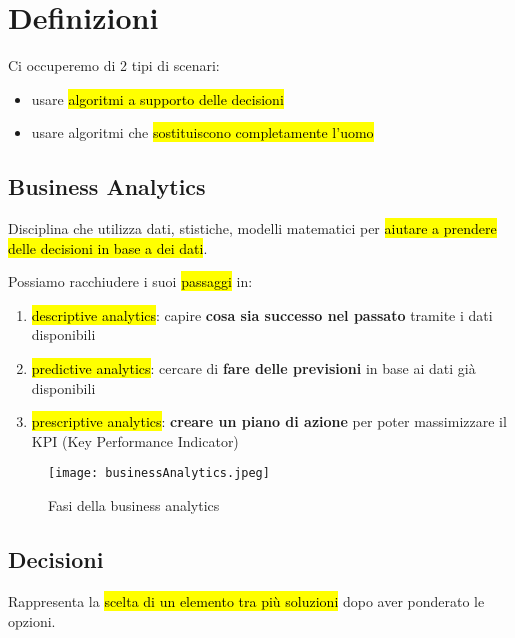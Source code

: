 \section{Definizioni}

Ci occuperemo di 2 tipi di scenari:
\begin{itemize}
	\item usare \hl{algoritmi a supporto delle decisioni}
	\item usare algoritmi che \hl{sostituiscono completamente l'uomo}
\end{itemize}


\subsection{Business Analytics}

Disciplina che utilizza dati, stistiche, modelli matematici per \hl{aiutare a prendere delle decisioni in base a dei dati}.

Possiamo racchiudere i suoi \hl{passaggi} in:
\begin{enumerate}
	\item \hl{descriptive analytics}: capire \textbf{cosa sia successo nel passato} tramite i dati disponibili
	\item \hl{predictive analytics}: cercare di \textbf{fare delle previsioni} in base ai dati già disponibili
	\item \hl{prescriptive analytics}: \textbf{creare un piano di azione} per poter massimizzare il KPI (Key Performance Indicator)
\end{enumerate}

\begin{figure}[H]
\centering
\texttt{[image: businessAnalytics.jpeg]}
\caption{Fasi della business analytics} 
\label{busana}
\end{figure}


\subsection{Decisioni}

Rappresenta la \hl{scelta di un elemento tra più soluzioni} dopo aver ponderato le opzioni.

